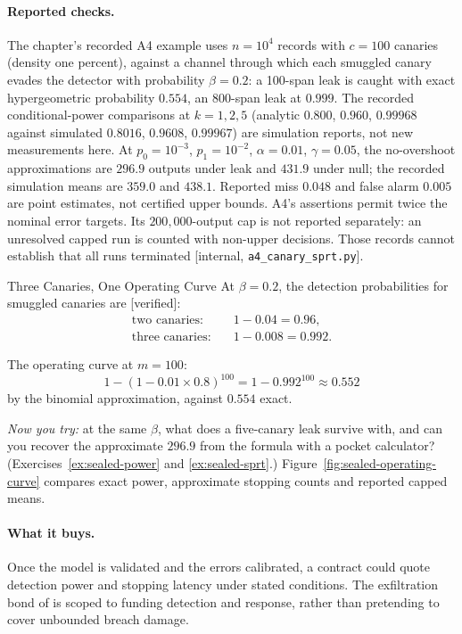 \documentclass[11pt,a4paper]{article}
\theoremstyle{definition}
\begin{document}
\paragraph{Reported checks.}
The chapter's recorded A4 example uses $n=10^4$ records with $c=100$ canaries (density
one percent), against a channel through which each smuggled canary evades the
detector with probability $\beta=0.2$: a 100-span leak is
caught with exact hypergeometric probability $0.554$, an 800-span leak at
$0.999$. The recorded conditional-power comparisons at
$k=1,2,5$ (analytic $0.800$, $0.960$, $0.99968$ against simulated $0.8016$,
$0.9608$, $0.99967$) are simulation reports, not new measurements here.
At $p_0=10^{-3}$, $p_1=10^{-2}$, $\alpha=0.01$, $\gamma=0.05$, the
no-overshoot approximations are $296.9$ outputs under leak and $431.9$ under
null; the recorded simulation means are $359.0$ and $438.1$. Reported miss
$0.048$ and false alarm $0.005$ are point estimates, not certified upper
bounds. A4's assertions permit twice the nominal error targets. Its
$200{,}000$-output cap is not reported separately: an unresolved capped run
is counted with non-upper decisions. Those records cannot establish that all
runs terminated [internal, \texttt{a4\_canary\_sprt.py}].

\begin{pdexample}{Three Canaries, One Operating Curve}
\setlength{\parskip}{4pt plus 1pt}
At $\beta=0.2$, the detection probabilities for smuggled canaries are
[verified]:
\[
\begin{aligned}
\text{two canaries:}\quad &1-0.04=0.96,\\
\text{three canaries:}\quad &1-0.008=0.992.
\end{aligned}
\]

The operating curve at $m=100$:
\[
1-(1-0.01\times0.8)^{100}=1-0.992^{100}\approx0.552
\]
by the binomial approximation, against $0.554$ exact.

\emph{Now you try:} at the
same $\beta$, what does a five-canary leak survive with, and can you recover
the approximate $296.9$ from the formula with a pocket calculator?
(Exercises~\ref{ex:sealed-power} and \ref{ex:sealed-sprt}.)
Figure~\ref{fig:sealed-operating-curve} compares exact power, approximate
stopping counts and reported capped means.
\end{pdexample}



\paragraph{What it buys.}
Once the model is validated and the errors calibrated, a contract could
quote detection power and stopping latency under stated conditions. The exfiltration bond of
 is scoped to funding
detection and response, rather than pretending to cover unbounded breach
damage.
\end{document}
